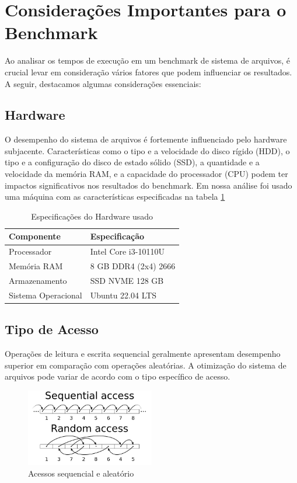 \documentclass[
	12pt,				%
	openright,			%
	oneside,			%
	a4paper,			%
	chapter=TITLE,		%
	english,			%
	french,				%
	spanish,			%
	brazil				%
	]{abntex2}
\theoremstyle{definition}
\begin{document}
\section{Considerações Importantes para o Benchmark}

Ao analisar os tempos de execução em um benchmark de sistema de arquivos, é crucial levar em 
consideração vários fatores que podem influenciar os resultados. A seguir, destacamos
algumas considerações essenciais:

\subsection{Hardware}

O desempenho do sistema de arquivos é fortemente influenciado pelo hardware 
subjacente. Características como o tipo e a velocidade do disco rígido (HDD), 
o tipo e a configuração do disco de estado sólido (SSD), a quantidade e a 
velocidade da memória RAM, e a capacidade do processador (CPU) podem ter 
impactos significativos nos resultados do benchmark. Em nossa análise foi usado
uma máquina com as características especificadas na tabela \ref{tab:ideapad_specs}


\begin{table}[H]
    \centering
    \caption{Especificações do Hardware usado}
    \begin{tabular}{@{}ll@{}}
        \toprule
        \textbf{Componente} & \textbf{Especificação} \\
        \midrule
        Processador & Intel Core i3-10110U \\
        Memória RAM & 8 GB DDR4 (2x4) 2666 \\
        Armazenamento & SSD NVME 128 GB \\
        Sistema Operacional & Ubuntu 22.04 LTS \\
        \bottomrule
    \end{tabular}
    \label{tab:ideapad_specs}
\end{table}
\subsection{Tipo de Acesso}

Operações de leitura e escrita sequencial geralmente apresentam desempenho superior 
em comparação com operações aleatórias. A otimização do sistema de arquivos 
pode variar de acordo com o tipo específico de acesso.

\begin{figure}[H]
	\centering
	\includegraphics[width=0.5\textwidth]{RandomVsSeq.png}
	\caption{Acessos sequencial e aleatório}
\end{figure}
\end{document}
